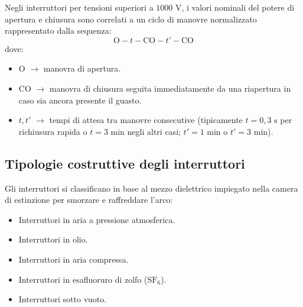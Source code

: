 Negli interruttori per tensioni superiori a $1000\text{ V}$, i valori nominali del potere di apertura e chiusura sono correlati a un ciclo di manovre normalizzato rappresentato dalla sequenza:
\[\text{O} - t - \text{CO} - t' - \text{CO}\]
dove:
\begin{itemize}
    \item $\text{O}$ $\rightarrow$ manovra di apertura.
    \item $\text{CO}$ $\rightarrow$ manovra di chiusura seguita immediatamente da una riapertura in caso sia ancora presente il guasto.
    \item $t, t'$ $\rightarrow$ tempi di attesa tra manovre consecutive (tipicamente $t = 0{,}3\text{ s}$ per richiusura rapida o $t = 3\text{ min}$ negli altri casi; $t' = 1\text{ min}$ o $t' = 3\text{ min}$).
\end{itemize}

\subsection{Tipologie costruttive degli interruttori}
Gli interruttori si classificano in base al mezzo dielettrico impiegato nella camera di estinzione per smorzare e raffreddare l'arco:
\begin{itemize}
    \item Interruttori in aria a pressione atmosferica.
    \item Interruttori in olio.
    \item Interruttori in aria compressa.
    \item Interruttori in esafluoruro di zolfo ($\text{SF}_6$).
    \item Interruttori sotto vuoto.
\end{itemize}

